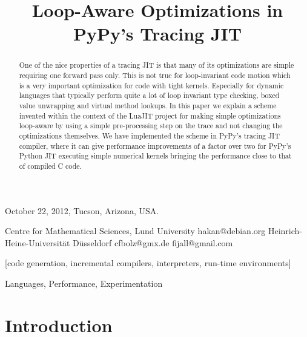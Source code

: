 \documentclass[preprint]{sigplanconf}
\begin{document}
 {October 22, 2012, Tucson, Arizona, USA.}


\title{Loop-Aware Optimizations in PyPy's Tracing JIT}

           {Centre for Mathematical Sciences, Lund University}
           {hakan@debian.org}
           {Heinrich-Heine-Universität Düsseldorf}
           {cfbolz@gmx.de}
           {}
           {fijall@gmail.com}

\maketitle

\begin{abstract}
One of the nice properties of a tracing JIT is that many of its optimizations
are simple requiring one forward pass only. This is not true for loop-invariant code
motion which is a very important optimization for code with tight kernels.
Especially for dynamic languages that typically perform quite a lot of loop invariant
type checking, boxed value unwrapping and virtual method lookups.
In this paper we explain a scheme invented within the context of the LuaJIT project
for making simple optimizations loop-aware by
using a simple pre-processing step on the trace and not changing the
optimizations themselves.
We have implemented the scheme in PyPy's tracing JIT compiler,
where it can give performance improvements of a
factor over two for PyPy's Python JIT executing simple numerical kernels
bringing the performance close to that of compiled C code.
\end{abstract}

[code generation,
incremental compilers, interpreters, run-time environments]

\terms
Languages, Performance, Experimentation


\section{Introduction}
\end{document}
